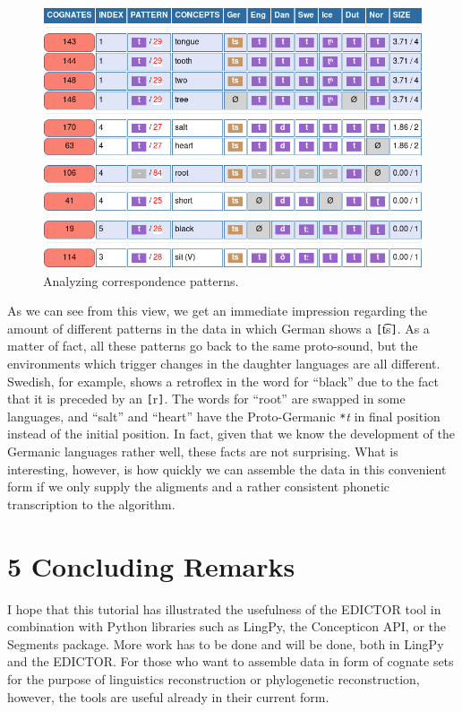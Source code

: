\documentclass[a4paper,svgnames]{scrartcl}
\begin{document}
\begin{figure}
\centering
\includegraphics{images/figure-22.png}
\caption{Analyzing correspondence patterns.}
\end{figure}

As we can see from this view, we get an immediate impression regarding
the amount of different patterns in the data in which German shows a
\texttt{{[}}t͡s\texttt{{]}}. As a matter of fact, all these patterns go
back to the same proto-sound, but the environments which trigger changes
in the daughter languages are all different. Swedish, for example, shows
a retroflex in the word for ``black'' due to the fact that it is
preceded by an \texttt{{[}}r\texttt{{]}}. The words for ``root'' are
swapped in some languages, and ``salt'' and ``heart'' have the
Proto-Germanic \texttt{*}\emph{t} in final position instead of the
initial position. In fact, given that we know the development of the
Germanic languages rather well, these facts are not surprising. What is
interesting, however, is how quickly we can assemble the data in this
convenient form if we only supply the aligments and a rather consistent
phonetic transcription to the algorithm.

\section*{5 Concluding Remarks}\label{concluding-remarks}

I hope that this tutorial has illustrated the usefulness of the EDICTOR
tool in combination with Python libraries such as LingPy, the
Concepticon API, or the Segments package. More work has to be done and
will be done, both in LingPy and the EDICTOR. For those who want to
assemble data in form of cognate sets for the purpose of linguistics
reconstruction or phylogenetic reconstruction, however, the tools are
useful already in their current form.
\end{document}
